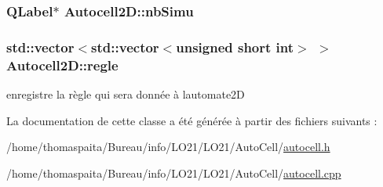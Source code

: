 \subsubsection[{\texorpdfstring{nb\+Simu}{nbSimu}}]{\setlength{\rightskip}{0pt plus 5cm}Q\+Label$\ast$ Autocell2\+D\+::nb\+Simu\hspace{0.3cm}{\ttfamily [protected]}}\hypertarget{class_autocell2_d_a77c628582ad0c795ec3d2e1733f2d53f}{}\label{class_autocell2_d_a77c628582ad0c795ec3d2e1733f2d53f}
\subsubsection[{\texorpdfstring{regle}{regle}}]{\setlength{\rightskip}{0pt plus 5cm}std\+::vector$<$std\+::vector$<$unsigned short int$>$ $>$ Autocell2\+D\+::regle\hspace{0.3cm}{\ttfamily [protected]}}\hypertarget{class_autocell2_d_a238eef6674e510f6ce39d93427c6cad5}{}\label{class_autocell2_d_a238eef6674e510f6ce39d93427c6cad5}
enregistre la règle qui sera donnée à l\textquotesingle{}automate2D 

La documentation de cette classe a été générée à partir des fichiers suivants \+:\begin{DoxyCompactItemize}
\item 
/home/thomaspaita/\+Bureau/info/\+L\+O21/\+L\+O21/\+Auto\+Cell/\hyperlink{autocell_8h}{autocell.\+h}\item 
/home/thomaspaita/\+Bureau/info/\+L\+O21/\+L\+O21/\+Auto\+Cell/\hyperlink{autocell_8cpp}{autocell.\+cpp}\end{DoxyCompactItemize}
